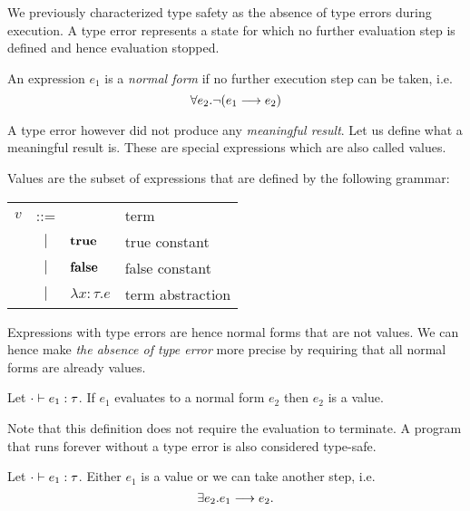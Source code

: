 {We previously characterized type safety as the absence of type errors during
execution. A type error represents a state for which no further evaluation step
is defined and hence evaluation stopped.

\begin{defn}
  An expression $e_1$ is a \emph{normal form} if no further execution step can be
  taken, i.e.
  \[ \forall e_2. \neg ({e_1} \longrightarrow {e_2}) \]
\end{defn}

A type error however did not produce any \emph{meaningful result}. Let us define
what a meaningful result is. These are special expressions which are also called
values.

\begin{defn}[Value]
  Values are the subset of expressions that are defined by the following
  grammar:
  \begin{center}
    \begin{tabular}{lcll}
      $v$ & ::=    &                    & term             \\
          & $\mid$ & $\textbf{true}$            & true constant    \\
          & $\mid$ & $\textbf{false}$           & false constant   \\
          & $\mid$ & $\lambda x:\tau.e$ & term abstraction \\
    \end{tabular}
  \end{center}
\end{defn}

Expressions with type errors are hence normal forms that are not values. We can
hence make \emph{the absence of type error} more precise by requiring that all
normal forms are already values.

\begin{thm}
  Let ${\cdot} \vdash {e_1} : {\tau}$. If $e_1$ evaluates to a normal form $e_2$
  then $e_2$ is a value.
\end{thm}

Note that this definition does not require the evaluation to terminate.  A
program that runs forever without a type error is also considered type-safe.


\begin{lem}[Progress]
  Let ${\cdot} \vdash {e_1} : {\tau}$. Either $e_1$ is a value or we can take another
  step, i.e.
  \[ \exists e_2. {e_1} \longrightarrow {e_2}. \]
\end{lem}


}
